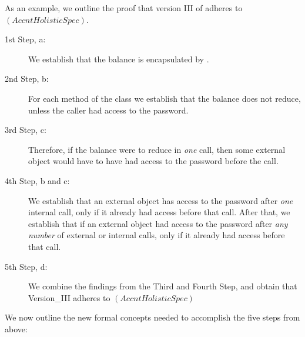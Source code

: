As an example, we   outline the proof that version III of  adheres to $(AccntHolisticSpec)$.

\begin{description}
\item[1st Step, a:] We establish that the balance %
is encapsulated by . 


\item[2nd Step, b:] 
For each method of the class    we establish that   
the balance does not reduce, unless the caller had access 
to the password.

\item[3rd Step, c:]  
Therefore, if the balance were to reduce in \emph{one} call, then some
external object would have to have had access to the password before the call.

\item[4th Step, b and c:] We establish %
that   an external object has access to 
the password after \emph{one} internal call, only if it already had access before that call.
After that, we establish  that if an external object had access to 
the password after \emph{any number} of external or internal 
calls, only if it already had access before that call.

\item[5th Step, d:] We   combine the findings from the Third and Fourth Step, and obtain
that  Version\_III adheres to $(AccntHolisticSpec)$

\end{description} 
 
We  now outline  the new formal concepts needed to accomplish the five steps from above:

